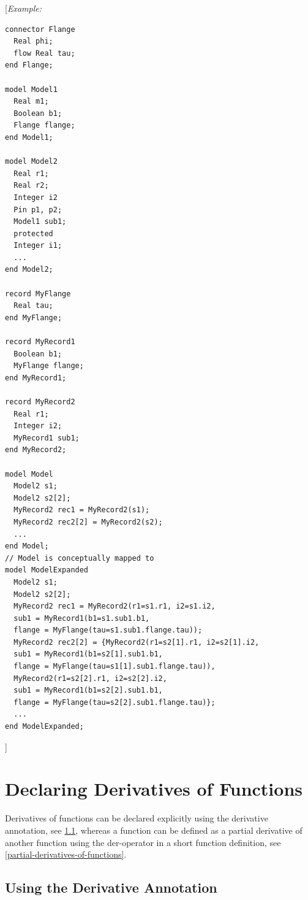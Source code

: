 \documentclass[10pt,a4paper]{report}
\def\doublelabel#1{\label{#1}\hypertarget{#1}{}}
\begin{document}
{[}\emph{Example:}

\begin{lstlisting}[language=modelica]
connector Flange
  Real phi;
  flow Real tau;
end Flange;

model Model1
  Real m1;
  Boolean b1;
  Flange flange;
end Model1;

model Model2
  Real r1;
  Real r2;
  Integer i2
  Pin p1, p2;
  Model1 sub1;
  protected
  Integer i1;
  ...
end Model2;

record MyFlange
  Real tau;
end MyFlange;

record MyRecord1
  Boolean b1;
  MyFlange flange;
end MyRecord1;

record MyRecord2
  Real r1;
  Integer i2;
  MyRecord1 sub1;
end MyRecord2;

model Model
  Model2 s1;
  Model2 s2[2];
  MyRecord2 rec1 = MyRecord2(s1);
  MyRecord2 rec2[2] = MyRecord2(s2);
  ...
end Model;
// Model is conceptually mapped to
model ModelExpanded
  Model2 s1;
  Model2 s2[2];
  MyRecord2 rec1 = MyRecord2(r1=s1.r1, i2=s1.i2,
  sub1 = MyRecord1(b1=s1.sub1.b1,
  flange = MyFlange(tau=s1.sub1.flange.tau));
  MyRecord2 rec2[2] = {MyRecord2(r1=s2[1].r1, i2=s2[1].i2,
  sub1 = MyRecord1(b1=s2[1].sub1.b1,
  flange = MyFlange(tau=s1[1].sub1.flange.tau)),
  MyRecord2(r1=s2[2].r1, i2=s2[2].i2,
  sub1 = MyRecord1(b1=s2[2].sub1.b1,
  flange = MyFlange(tau=s2[2].sub1.flange.tau)};
  ...
end ModelExpanded;
\end{lstlisting}
{]}

\section{Declaring Derivatives of Functions}\doublelabel{declaring-derivatives-of-functions}

Derivatives of functions can be declared explicitly using the derivative
annotation, see \ref{using-the-derivative-annotation}, whereas a function can be defined as a
partial derivative of another function using the der-operator in a short
function definition, see \ref{partial-derivatives-of-functions}.

\subsection{Using the Derivative Annotation}\doublelabel{using-the-derivative-annotation}
\end{document}

